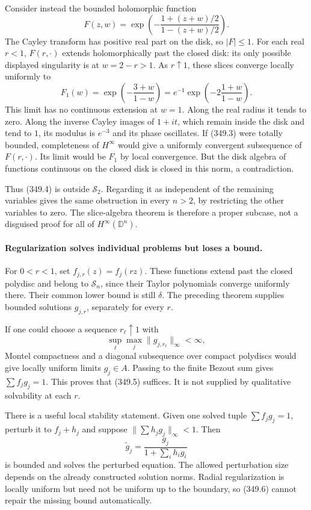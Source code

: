 \documentclass[11pt]{article}
\begin{document}
Consider instead the bounded holomorphic function
\[
 F(z,w)=\exp\left(-\frac{1+(z+w)/2}{1-(z+w)/2}\right).
 \tag{349.4}
\]
The Cayley transform has positive real part on the disk, so
$|F|\leq1$. For each real $r<1$, $F(r,\cdot)$ extends holomorphically
past the closed disk: its only possible displayed singularity is at
$w=2-r>1$. As $r\uparrow1$, these slices converge locally uniformly to
\[
 F_1(w)=\exp\left(-\frac{3+w}{1-w}\right)
       =e^{-1}\exp\left(-2\frac{1+w}{1-w}\right).
\]
This limit has no continuous extension at $w=1$. Along the real
radius it tends to zero. Along the inverse Cayley images of
$1+it$, which remain inside the disk and tend to $1$, its modulus
is $e^{-3}$ and its phase oscillates. If (349.3) were totally
bounded, completeness of $H^\infty$ would give a uniformly convergent
subsequence of $F(r,\cdot)$. Its limit would be $F_1$ by local
convergence. But the disk algebra of functions continuous on the
closed disk is closed in this norm, a contradiction.

Thus (349.4) is outside $\mathcal S_2$. Regarding it as independent
of the remaining variables gives the same obstruction in every
$n>2$, by restricting the other variables to zero. The slice-algebra
theorem is therefore a proper subcase, not a disguised proof for all
of $H^\infty(\mathbb D^n)$.

\paragraph{Regularization solves individual problems but loses a bound.}
For $0<r<1$, set $f_{j,r}(z)=f_j(rz)$. These functions extend past
the closed polydisc and belong to $\mathcal S_n$, since their Taylor
polynomials converge uniformly there. Their common lower bound is
still $\delta$. The preceding theorem supplies bounded solutions
$g_{j,r}$, separately for every $r$.

If one could choose a sequence $r_\ell\uparrow1$ with
\[
 \sup_\ell\max_j\|g_{j,r_\ell}\|_\infty<\infty,
 \tag{349.5}
\]
Montel compactness and a diagonal subsequence over compact polydiscs
would give locally uniform limits $g_j\in A$. Passing to the finite
Bezout sum gives $\sum f_jg_j=1$. This proves that (349.5) suffices.
It is not supplied by qualitative solvability at each $r$.

There is a useful local stability statement. Given one solved tuple
$\sum f_jg_j=1$, perturb it to $f_j+h_j$ and suppose
$\|\sum h_jg_j\|_\infty<1$. Then
\[
 \widetilde g_j=\frac{g_j}{1+\sum_i h_ig_i}
 \tag{349.6}
\]
is bounded and solves the perturbed equation. The allowed perturbation
size depends on the already constructed solution norms. Radial
regularization is locally uniform but need not be uniform up to the
boundary, so (349.6) cannot repair the missing bound automatically.
\end{document}
